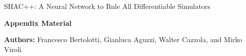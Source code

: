 \newpage
\appendix
\onecolumn
\begin{center}
\huge{SHAC++: A Neural Network to Rule All Differentiable Simulators 
\vspace{0.2em}

\LARGE{
\textbf{Appendix Material}
}
}

\vspace{0.5em}
\large{
\textbf{Authors:} Francesco Bertolotti, Gianluca Aguzzi, Walter Cazzola, and Mirko Viroli 
}
\end{center}







